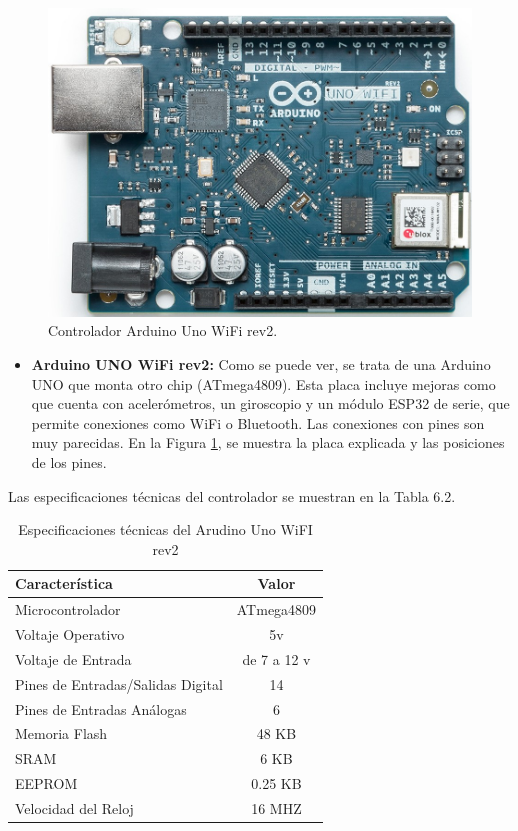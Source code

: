 \begin{figure}[h] 
    \centering
    \includegraphics[width=.45\textwidth]{capitulos/capitulo6/unowifi.jpg}
    \caption{Controlador Arduino Uno WiFi rev2.}
    \label{fig:unowifi}
\end{figure}

\begin{itemize}
    \item \textbf{Arduino UNO WiFi rev2:} Como se puede ver, se trata de una Arduino UNO que monta otro chip (ATmega4809). Esta placa incluye mejoras como que cuenta con acelerómetros, un giroscopio y un módulo ESP32 de serie, que permite conexiones como WiFi o Bluetooth. Las conexiones con pines son muy parecidas. En la Figura \ref{fig:unowifi}, se muestra la placa explicada y las posiciones de los pines.
\end{itemize}

Las especificaciones técnicas del controlador se muestran en la Tabla 6.2.

\begin{table}[h]
    \centering
    \begin{tabular}{|l|c|}
        \rowcolor[gray]{.5}
        \hline
        \color{white}Característica & \color{white}Valor \\
        \hline
        Microcontrolador & ATmega4809 \\
        \hline
        Voltaje Operativo & 5v \\
        \hline
        Voltaje de Entrada  & de 7 a 12 v \\
        \hline
        Pines de Entradas/Salidas Digital & 14 \\
        \hline
        Pines de Entradas Análogas & 6 \\
        \hline
        Memoria Flash & 48 KB \\
        \hline
        SRAM & 6 KB \\
        \hline
        EEPROM & 0.25 KB \\
        \hline
        Velocidad del Reloj & 16 MHZ \\
         \hline
    \end{tabular}
    \caption{Especificaciones técnicas del Arudino Uno WiFI rev2}
    \label{tab:arduinounoeifi}
\end{table}

